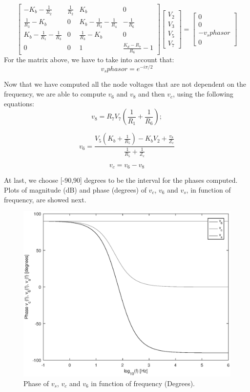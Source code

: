 $$ \left[ \begin{array}{cccc} - K_b -\frac{1}{R_2}  & \frac{1}{R_2} & K_b & 0 \\
\frac{1}{R_3} - K_b & 0 & K_b -\frac{1}{R_3}-\frac{1}{R_4} & -\frac{1}{R_6} \\
K_b-\frac{1}{R_1}-\frac{1}{R_3} & 0 & \frac{1}{R_3}-K_b & 0 
\\ 0 & 0 & 1 & \frac{K_d - R_7}{R_6}-1\end{array} \right]
\left[ \begin{array}{c} V_2 \\ V_3 \\ V_5 \\ V_7 \end{array} \right] = 
\left[ \begin{array}{c} 0 \\ 0 \\ -v_sphasor \\ 0 \end{array} \right] $$
For the matrix above, we have to take into account that:
\begin{equation}
v_sphasor = e^{-i\pi/2}
\label{eq:vsphasor}
\end{equation}

Now that we have computed all the node voltages that are not dependent on the frequency, 
we are able to compute $v_6$ and $v_8$ and then $v_c$, using the following equations:
\begin{equation}
v_8 = R_7V_7(\frac{1}{R_1} + \frac{1}{R_6});
\label{eq:V_8}
\end{equation}

\begin{equation}
v_6 = \frac{V_5(K_b + \frac{1}{R_5}) - K_bV_2 + \frac{v_8}{Z_c}}{\frac{1}{R_5} + \frac{1}{Z_c}} 
\label{eq:V_6}
\end{equation}

\begin{equation}
v_c = v_6 - v_8
\label{eq:V_c}
\end{equation}

At last, we choose [-90,90] degrees to be the interval for the phases computed. 
Plots of magnitude (dB) and phase (degrees) of $v_c$, $v_6$ and $v_s$, in function of frequency, are showed next.
\begin{figure}[h!] \centering
\includegraphics[width=0.7\linewidth]{Phase(degrees).eps}
\caption{Phase of $v_s$, $v_c$ and $v_6$ in function of frequency (Degrees).}
\label{fig:phase}
\end{figure}

